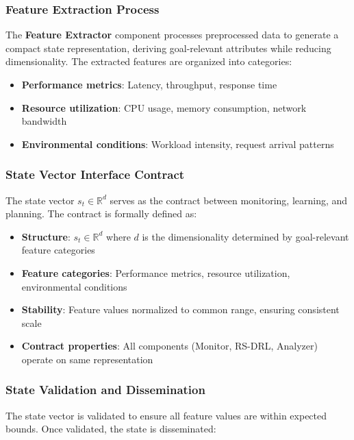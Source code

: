 \documentclass[11pt,a4paper]{article}
\begin{document}
\subsubsection{Feature Extraction Process}

The \textbf{Feature Extractor} component processes preprocessed data to generate a compact state representation, deriving goal-relevant attributes while reducing dimensionality. The extracted features are organized into categories:

\begin{itemize}
    \item \textbf{Performance metrics}: Latency, throughput, response time
    \item \textbf{Resource utilization}: CPU usage, memory consumption, network bandwidth
    \item \textbf{Environmental conditions}: Workload intensity, request arrival patterns
\end{itemize}

\subsubsection{State Vector Interface Contract}

The state vector $s_t \in \mathbb{R}^d$ serves as the contract between monitoring, learning, and planning. The contract is formally defined as:

\begin{itemize}
    \item \textbf{Structure}: $s_t \in \mathbb{R}^d$ where $d$ is the dimensionality determined by goal-relevant feature categories
    \item \textbf{Feature categories}: Performance metrics, resource utilization, environmental conditions
    \item \textbf{Stability}: Feature values normalized to common range, ensuring consistent scale
    \item \textbf{Contract properties}: All components (Monitor, RS-DRL, Analyzer) operate on same representation
\end{itemize}

\subsubsection{State Validation and Dissemination}

The state vector is validated to ensure all feature values are within expected bounds. Once validated, the state is disseminated:
\end{document}
